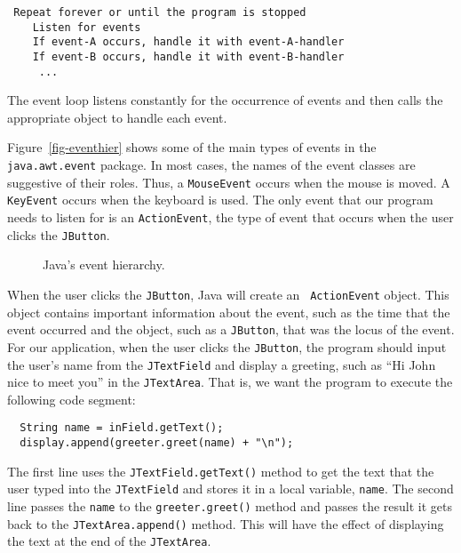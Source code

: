 \begin{jjjlisting}
\begin{lstlisting}
 Repeat forever or until the program is stopped
    Listen for events
    If event-A occurs, handle it with event-A-handler
    If event-B occurs, handle it with event-B-handler
     ...
\end{lstlisting}
\end{jjjlisting}

\noindent The event loop listens constantly for the occurrence
of events and then calls the appropriate object to handle each event.

Figure~\ref{fig-eventhier} shows some of the main types of events in
the {\tt java.awt.event} package.  In most cases, the names of the
event classes are suggestive of their roles.  Thus, a {\tt MouseEvent}
occurs when the mouse is moved. A {\tt KeyEvent} occurs when the
keyboard is used. The only event that our program needs to listen for
is an {\tt ActionEvent}, the type of event that occurs when the user
clicks  the {\tt JButton}.

\begin{figure}[tb]
{Java's event hierarchy.
\label{fig-eventhier}
\label{pg-fig-eventhier}}
\end{figure}

When the user clicks the {\tt JButton}, Java will create an {\tt
ActionEvent} object.  This object contains important information about
the event, such as the time that the event occurred and the object,
such as a {\tt JButton}, that was the locus of the event.  For our
application, when the user clicks the {\tt JButton}, the program
should input the user's name from the {\tt JTextField} and display a
greeting, such as ``Hi John nice to meet you'' in the {\tt JTextArea}.
That is, we want the program to execute the following code segment:

\begin{jjjlisting}
\begin{lstlisting}
  String name = inField.getText();
  display.append(greeter.greet(name) + "\n");
\end{lstlisting}
\end{jjjlisting}

\noindent The first line uses the {\tt JTextField.getText()} method
to get the text that the user typed into the {\tt JTextField} and
stores it in a local variable, {\tt name}. The second line passes the
{\tt name} to the {\tt greeter.greet()} method and passes the result it
gets back to the {\tt JTextArea.append()} method. This will have the
effect of displaying the text at the end of the {\tt JTextArea}. 

